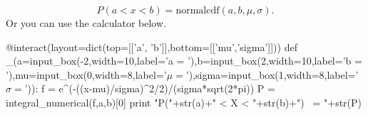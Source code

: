 \documentclass[10pt,]{book}
\numberwithin{equation}{section}
\newcommand{\lt}{<}
\begin{document}
\begin{equation*}
P( a \lt x \lt b ) = \text{normalcdf}(a,b,\mu, \sigma).
\end{equation*}
Or you can use the calculator below.%
\par
\hypertarget{p-1199}{}%
\leavevmode%
\begin{sageinput}
@interact(layout=dict(top=[['a', 'b']],bottom=[['mu','sigma']]))
def _(a=input_box(-2,width=10,label='a = '),b=input_box(2,width=10,label='b = '),mu=input_box(0,width=8,label='$\mu = $'),sigma=input_box(1,width=8,label='$\sigma = $')):
    f = e^(-((x-mu)/sigma)^2/2)/(sigma*sqrt(2*pi))
    P = integral_numerical(f,a,b)[0]
    print "P("+str(a)+" < X < "+str(b)+") ~= "+str(P)
\end{sageinput}
%
%
%
\typeout{************************************************}
\typeout{************************************************}
%
\end{document}
